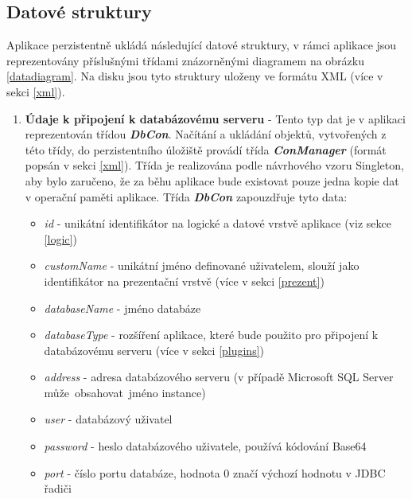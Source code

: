 \documentclass[czech,bachelor,public,dept460,male,cpdeclaration,twoside]{diploma}
\begin{document}
\newpage

\subsection{Datové struktury} \label{datastruct}
Aplikace perzistentně ukládá následující datové struktury, v rámci aplikace jsou reprezentovány příslušnými třídami znázorněnými diagramem na obrázku \ref{datadiagram}. Na disku jsou tyto struktury uloženy ve formátu XML (více v sekci \ref{xml}).

\begin{enumerate}
  \item \textbf{Údaje k připojení k databázovému serveru} - Tento typ dat je v aplikaci reprezentován třídou \textbf{\emph{DbCon}}. Načítání a ukládání objektů, vytvořených z této třídy, do perzistentního úložiště provádí třída \textbf{\emph{ConManager}} (formát popsán v sekci \ref{xml}). Třída je realizována podle návrhového vzoru Singleton, aby bylo zaručeno, že za běhu aplikace bude existovat pouze jedna kopie dat v operační paměti aplikace. Třída \textbf{\emph{DbCon}} zapouzdřuje tyto data:
\begin{itemize}
  	\item \textit{id} - unikátní identifikátor na logické a datové vrstvě aplikace (viz sekce \ref{logic})
  	\item \textit{customName} - unikátní jméno definované uživatelem, slouží jako identifikátor na prezentační vrstvě (více v sekci \ref{prezent})
  	\item \textit{databaseName} - jméno databáze
  	\item \textit{databaseType} - rozšíření aplikace, které bude použito pro připojení k databázovému serveru (více v sekci \ref{plugins})
  	\item \textit{address} - adresa databázového serveru (v případě Microsoft SQL Server může~obsahovat~jméno instance)
  	\item \textit{user} - databázový uživatel
  	\item \textit{password} - heslo databázového uživatele, používá kódování Base64
  	\item \textit{port} - číslo portu databáze, hodnota 0 značí výchozí hodnotu v JDBC řadiči
\end{itemize}
  

\end{enumerate}
\end{document}
